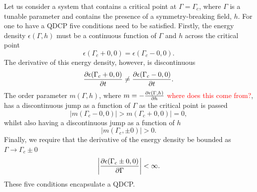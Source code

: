 Let us consider a system that contains a critical point at
\( \Gamma = \Gamma_c \), where \( \Gamma \) is a tunable parameter and contains
the presence of a symmetry-breaking field, \( h \).
For one to have a QDCP five conditions need to be satisfied.
Firstly, the energy density \( \epsilon(\Gamma, h) \) must be a continuous
function of \( \Gamma \) and \( h \) across the critical point
\begin{equation}
    \epsilon(\Gamma_c + 0, 0) = \epsilon(\Gamma_c - 0, 0).
    \label{eq: continuous-energy-cond}
\end{equation}
The derivative of this energy density, however, is discontinuous
\begin{equation}
    \pdv{\epsilon(\Gamma_c + 0, 0)}{t} \neq \pdv{\epsilon(\Gamma_c - 0, 0)}{t}.
\end{equation}
The order parameter \( m(\Gamma, h) \), where
\( m=-\pdv{\epsilon(\Gamma, h)}{h} \)
\textcolor{red}{where does this come from?},
has a discontinuous jump as a function of \( \Gamma \) as the critical point is
passed
\begin{equation}
    |m(\Gamma_c - 0, 0)| > m(\Gamma_c + 0, 0)| = 0,
\end{equation}
whilst also having a discontinuous jump as a function of \( h \)
\begin{equation}
    |m(\Gamma_c, \pm 0)| > 0.
\end{equation}
Finally, we require that the derivative of the energy density be bounded as
\( \Gamma \rightarrow \Gamma_c \pm 0 \)
\begin{equation}
    \left|\pdv{\epsilon(\Gamma_c \pm 0, 0)}{\Gamma}\right| < \infty.
    \label{eq: bounded-energy-derivative-cond}
\end{equation}
These five conditions encapsulate a QDCP\@.

